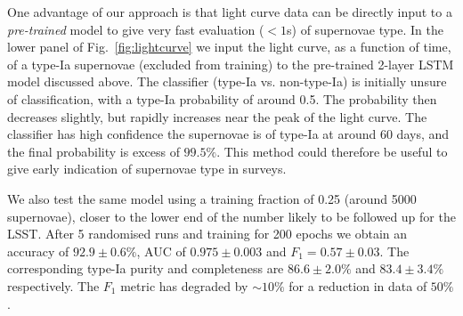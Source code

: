 \documentclass[twocolumn]{aastex61}
\begin{document}

One advantage of our approach is that light curve data can be directly input to a {\em pre-trained} model to give very fast evaluation ($<1$s) of supernovae type. In the lower panel of Fig.~\ref{fig:lightcurve} we input the light curve, as a function of time, of a type-Ia supernovae (excluded from training) to the pre-trained 2-layer LSTM model discussed above. The classifier (type-Ia vs. non-type-Ia) is initially unsure of classification, with a type-Ia probability of around 0.5. The probability then decreases slightly, but rapidly increases near the peak of the light curve. The classifier has high confidence the supernovae is of type-Ia at around 60 days, and the final probability is excess of $99.5\%$.  This method could therefore be useful to give early indication of supernovae type in surveys.

We also test the same model using a training fraction of 0.25 (around 5000 supernovae), closer to the lower end of the number likely to be followed up for the LSST. After 5 randomised runs and training for 200 epochs we obtain an accuracy of $92.9 \pm 0.6\%$, AUC of $0.975 \pm 0.003$ and $F_1 = 0.57 \pm 0.03$. The corresponding type-Ia purity and completeness are $86.6\pm2.0\%$ and $83.4\pm3.4\%$ respectively. The $F_1$ metric has degraded by $\sim10\%$ for a reduction in data of $50\%$.
\end{document}
